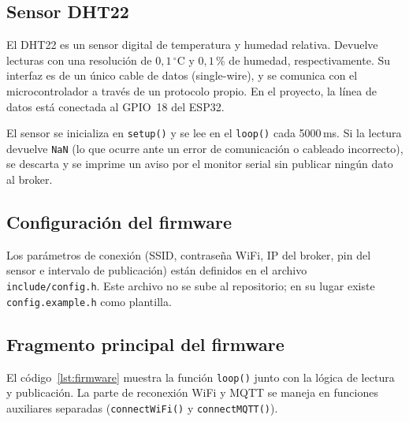 \documentclass[12pt, a4paper]{article}
\begin{document}
\subsection{Sensor DHT22}

El DHT22 es un sensor digital de temperatura y humedad relativa. Devuelve lecturas
con una resolución de $0{,}1\,^\circ\text{C}$ y $0{,}1\,\%$ de humedad,
respectivamente. Su interfaz es de un único cable de datos (single-wire), y se
comunica con el microcontrolador a través de un protocolo propio. En el proyecto, la
línea de datos está conectada al GPIO~18 del ESP32.

El sensor se inicializa en \texttt{setup()} y se lee en el \texttt{loop()} cada
5000\,ms. Si la lectura devuelve \texttt{NaN} (lo que ocurre ante un error de
comunicación o cableado incorrecto), se descarta y se imprime un aviso por el monitor
serial sin publicar ningún dato al broker.

\subsection{Configuración del firmware}

Los parámetros de conexión (SSID, contraseña WiFi, IP del broker, pin del sensor e
intervalo de publicación) están definidos en el archivo \texttt{include/config.h}.
Este archivo no se sube al repositorio; en su lugar existe \texttt{config.example.h}
como plantilla.

\subsection{Fragmento principal del firmware}

El código~\ref{lst:firmware} muestra la función \texttt{loop()} junto con la lógica
de lectura y publicación. La parte de reconexión WiFi y MQTT se maneja en funciones
auxiliares separadas (\texttt{connectWiFi()} y \texttt{connectMQTT()}).
\end{document}
